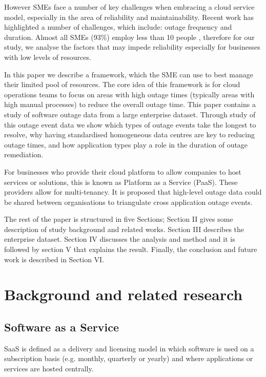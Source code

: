 \documentclass[conference]{IEEEtran}
\begin{document}
However SMEs face a number of key challenges when embracing a cloud service model, especially in the area of reliability and maintainability. Recent work has highlighted a number of challenges, which include: outage frequency and duration. Almost all SMEs (93\%) employ less than 10 people \cite{europa2015sme}, therefore for our study, 
we analyse the factors that may impede reliability especially for businesses  with low levels of resources. \par

In this paper we describe a framework, which the SME can use to best manage their limited pool of resources. The core idea of this framework is for cloud operations teams to focus on areas with high outage times (typically areas with high manual processes) to reduce the overall outage time. This paper contains a study of software outage data from a large enterprise dataset. Through study of this outage event data we show which types of outage events take the longest to resolve, why having standardised homogeneous data centres are key to reducing outage times, and how application types play a role in the duration of outage remediation. \par

For businesses who provide their cloud platform to allow companies to host services or solutions, this is known as Platform as a Service (PaaS). These providers allow for multi-tenancy. It is proposed that  high-level outage data could be shared between organisations to triangulate cross application outage events. \par

The rest of the paper is structured in five Sections; Section II gives some description of study background and related works. Section III describes the enterprise dataset. Section IV discusses the analysis and method and it is followed by section V that explains the result. Finally, the conclusion and future work is described in Section VI. \par


\section{Background and related research}

\subsection{Software as a Service}
SaaS is defined as a delivery and licensing model in which software is used on a subscription basis (e.g. monthly, quarterly or yearly) and where applications or services are hosted centrally. \par
\end{document}
